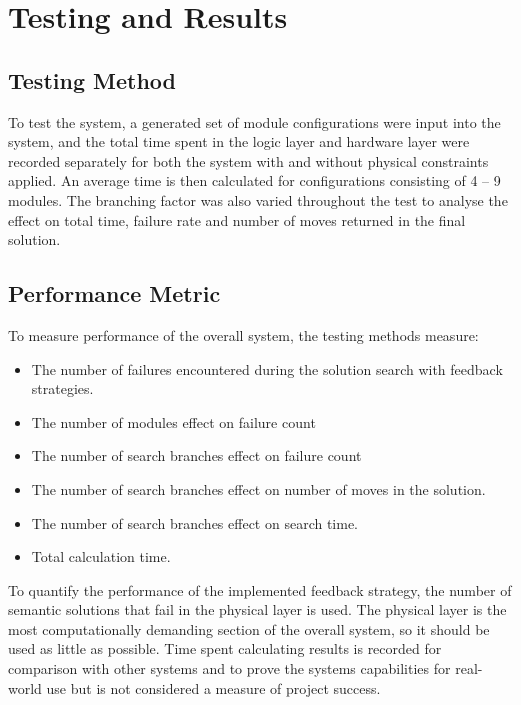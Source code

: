 \section{Testing and Results}
\subsection{Testing Method}
To test the system, a generated set of module configurations were input into the system, and the total time spent in the logic layer and hardware layer were recorded separately for both the system with and without physical constraints applied. An average time is then calculated for configurations consisting of 4 – 9 modules. The branching factor was also varied throughout the test to analyse the effect on total time, failure rate and number of moves returned in the final solution.

\subsection{Performance Metric}
To measure performance of the overall system, the testing methods measure:
\begin{itemize}[]
	\item The number of failures encountered during the solution search with feedback strategies.
	\item The number of modules effect on failure count
	\item The number of search branches effect on failure count
	\item The number of search branches effect on number of moves in the solution.
	\item The number of search branches effect on search time.
	\item Total calculation time.
\end{itemize}
To quantify the performance of the implemented feedback strategy, the number of semantic solutions that fail in the physical layer is used. The physical layer is the most computationally demanding section of the overall system, so it should be used as little as possible. Time spent calculating results is recorded for comparison with other systems and to prove the systems capabilities for real-world use but is not considered a measure of project success.

